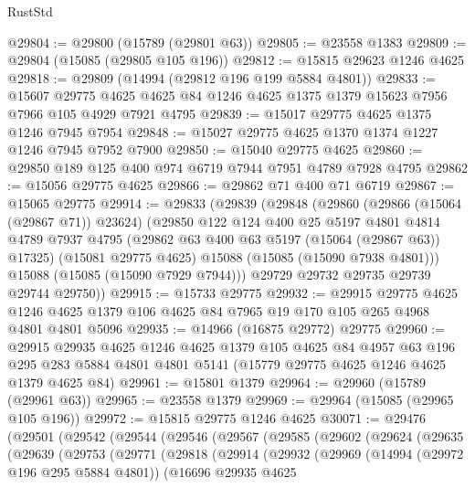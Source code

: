 \begin{lexlean}{RustStd}
\begin{coremodule}
@29804 := @29800 (@15789 (@29801 @63))
@29805 := @23558 @1383
@29809 := @29804 (@15085 (@29805 @105 @196))
@29812 := @15815 @29623 @1246 @4625
@29818 := @29809 (@14994 (@29812 @196 @199 @5884 @4801))
@29833 := @15607
    @29775
    @4625
    @4625
    @84
    @1246
    @4625
    @1375
    @1379
    @15623
    @7956
    @7966
    @105
    @4929
    @7921
    @4795
@29839 := @15017 @29775 @4625 @1375 @1246 @7945 @7954
@29848 := @15027 @29775 @4625 @1370 @1374 @1227 @1246 @7945 @7952 @7900
@29850 := @15040 @29775 @4625
@29860 := @29850 @189 @125 @400 @974 @6719 @7944 @7951 @4789 @7928 @4795
@29862 := @15056 @29775 @4625
@29866 := @29862 @71 @400 @71 @6719
@29867 := @15065 @29775
@29914 := @29833
    (@29839
      (@29848
        (@29860
          (@29866 (@15064 (@29867 @71)) @23624)
          (@29850
            @122
            @124
            @400
            @25
            @5197
            @4801
            @4814
            @4789
            @7937
            @4795
            (@29862 @63 @400 @63 @5197 (@15064 (@29867 @63)) @17325)
            (@15081 @29775 @4625)
            @15088
            (@15085 (@15090 @7938 @4801)))
          @15088
          (@15085 (@15090 @7929 @7944)))
        @29729
        @29732
        @29735
        @29739
        @29744
        @29750))
@29915 := @15733 @29775
@29932 := @29915
    @29775
    @4625
    @1246
    @4625
    @1379
    @106
    @4625
    @84
    @7965
    @19
    @170
    @105
    @265
    @4968
    @4801
    @4801
    @5096
@29935 := @14966 (@16875 @29772) @29775
@29960 := @29915
    @29935
    @4625
    @1246
    @4625
    @1379
    @105
    @4625
    @84
    @4957
    @63
    @196
    @295
    @283
    @5884
    @4801
    @4801
    @5141
    (@15779 @29775 @4625 @1246 @4625 @1379 @4625 @84)
@29961 := @15801 @1379
@29964 := @29960 (@15789 (@29961 @63))
@29965 := @23558 @1379
@29969 := @29964 (@15085 (@29965 @105 @196))
@29972 := @15815 @29775 @1246 @4625
@30071 := @29476
    (@29501
      (@29542
        (@29544
          (@29546
            (@29567
              (@29585
                (@29602
                  (@29624
                    (@29635
                      (@29639
                        (@29753
                          (@29771
                            (@29818
                              (@29914
                                (@29932
                                  (@29969
                                    (@14994 (@29972 @196 @295 @5884 @4801))
                                    (@16696
                                      @29935
                                      @4625

\end{coremodule}
\end{lexlean}
